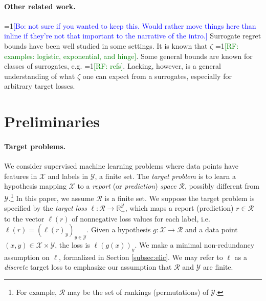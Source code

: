 \documentclass{article}
\theoremstyle{definition}\newtheorem{definition}{Definition}
\theoremstyle{definition}\newtheorem{assumption}{Assumption}
\newcommand{\Comments}{1}
\newcommand{\mynote}[2]{\ifnum\Comments=1\textcolor{#1}{#2}\fi}
\newcommand{\raf}[1]{\mynote{green}{[RF: #1]}}
\newcommand{\bo}[1]{\mynote{blue}{[Bo: #1]}}
\newcommand{\reals}{\mathbb{R}}
\newcommand{\R}{\mathcal{R}}
\newcommand{\X}{\mathcal{X}}
\newcommand{\Y}{\mathcal{Y}}
\begin{document}
\paragraph{Other related work.}
\bo{not sure if you wanted to keep this. Would rather move things here than inline if they're not that important to the narrative of the intro.}
Surrogate regret bounds have been well studied in some settings.
It is known that $\zeta$ \raf{examples: logistic, exponential, and hinge}.
Some general bounds are known for classes of surrogates, e.g. \raf{refs}.
Lacking, however, is a general understanding of what $\zeta$ one can expect from a surrogates, especially for arbitrary target losses.


\section{Preliminaries}


\paragraph{Target problems.}
We consider supervised machine learning problems where data points have features in $\X$ and labels in $\Y$, a finite set.
The \emph{target problem} is to learn a hypothesis mapping $\X$ to a \emph{report} (or \emph{prediction}) \emph{space} $\R$, possibly different from $\Y$.\footnote{For example, $\R$ may be the set of rankings (permutations) of $\Y$.}
In this paper, we assume $\R$ is a finite set.
We suppose the target problem is specified by the \emph{target loss} $\ell:\R\to\reals^\Y_+$, which maps a report (prediction) $r \in \R$ to the vector $\ell(r)$ of nonnegative loss values for each label, i.e. $\ell(r) = (\ell(r)_y)_{y\in\Y}$.
Given a hypothesis $g: \X \to \R$ and a data point $(x,y) \in \X \times \Y$, the loss is $\ell(g(x))_y$.
We make a minimal non-redundancy assumption on $\ell$, formalized in Section \ref{subsec:elic}.
We may refer to $\ell$ as a \emph{discrete} target loss to emphasize our assumption that $\R$ and $\Y$ are finite.
\end{document}
